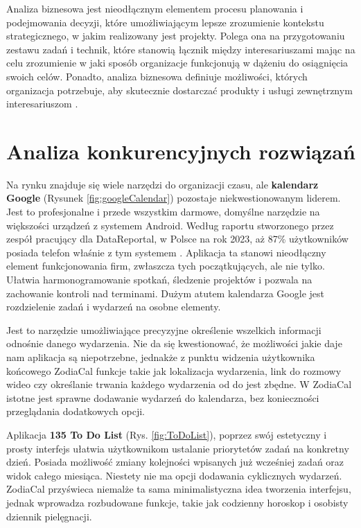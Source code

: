 Analiza biznesowa jest nieodłącznym elementem procesu planowania i podejmowania decyzji, które umożliwiającym lepsze zrozumienie kontekstu strategicznego, w jakim realizowany jest projekty. Polega ona na przygotowaniu zestawu zadań i technik, które stanowią łącznik między interesariuszami mając na celu zrozumienie w jaki sposób organizacje funkcjonują w dążeniu do osiągnięcia swoich celów. Ponadto, analiza biznesowa definiuje możliwości, których organizacja potrzebuje, aby skutecznie dostarczać produkty i usługi zewnętrznym interesariuszom \cite{businessanalysis}.

\section*{Analiza konkurencyjnych rozwiązań}

Na rynku znajduje się wiele narzędzi do organizacji czasu, ale \textbf{kalendarz Google} (Rysunek \ref{fig:googleCalendar}) pozostaje niekwestionowanym liderem. Jest to profesjonalne i przede wszystkim darmowe, domyślne narzędzie na większości urządzeń z systemem Android.
Według raportu stworzonego przez zespół pracujący dla DataReportal, w Polsce na rok 2023, aż 87\% użytkowników posiada
telefon właśnie z tym systemem \cite{datareportal}. Aplikacja ta stanowi nieodłączny element funkcjonowania firm, zwłaszcza tych początkujących,
ale nie tylko. Ułatwia harmonogramowanie spotkań, śledzenie projektów i pozwala na zachowanie kontroli nad terminami.
Dużym atutem kalendarza Google jest rozdzielenie zadań i wydarzeń na osobne elementy.

Jest to narzędzie umożliwiające precyzyjne określenie wszelkich informacji odnośnie danego wydarzenia. Nie da się kwestionować, że możliwości jakie daje nam aplikacja są niepotrzebne, jednakże z punktu widzenia użytkownika końcowego ZodiaCal funkcje takie jak lokalizacja wydarzenia, link do rozmowy wideo czy określanie trwania każdego wydarzenia od do jest zbędne. W ZodiaCal istotne jest sprawne dodawanie wydarzeń do kalendarza, bez konieczności przeglądania dodatkowych opcji.

\newpage

Aplikacja \textbf{135 To Do List} (Rys. \ref{fig:ToDoList}), poprzez swój estetyczny i prosty interfejs ułatwia użytkownikom ustalanie priorytetów zadań na konkretny dzień.
Posiada możliwość zmiany kolejności wpisanych już wcześniej zadań oraz widok całego miesiąca.
Niestety nie ma opcji dodawania cyklicznych wydarzeń. ZodiaCal przyświeca niemalże ta sama minimalistyczna idea tworzenia interfejsu, jednak wprowadza rozbudowane funkcje, takie jak codzienny horoskop i osobisty dziennik pielęgnacji.


